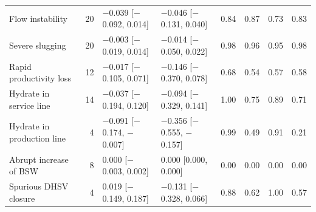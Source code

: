 \begin{tabular}{@{}>{\raggedright\arraybackslash}p{2.8cm} r l l rrrr@{}}
Flow instability & 20 & $-$0.039 [$-$0.092, 0.014] & $-$0.046 [$-$0.131, 0.040] & 0.84 & 0.87 & 0.73 & 0.83 \\
Severe slugging & 20 & $-$0.003 [$-$0.019, 0.014] & $-$0.014 [$-$0.050, 0.022] & 0.98 & 0.96 & 0.95 & 0.98 \\
Rapid productivity loss & 12 & $-$0.017 [$-$0.105, 0.071] & $-$0.146 [$-$0.370, 0.078] & 0.68 & 0.54 & 0.57 & 0.58 \\
Hydrate in service line & 14 & $-$0.037 [$-$0.194, 0.120] & $-$0.094 [$-$0.329, 0.141] & 1.00 & 0.75 & 0.89 & 0.71 \\
Hydrate in production line & 4 & $-$0.091 [$-$0.174, $-$0.007] & $-$0.356 [$-$0.555, $-$0.157] & 0.99 & 0.49 & 0.91 & 0.21 \\
Abrupt increase of BSW & 8 & 0.000 [$-$0.003, 0.002] & 0.000 [0.000, 0.000] & 0.00 & 0.00 & 0.00 & 0.00 \\
Spurious DHSV closure & 4 & 0.019 [$-$0.149, 0.187] & $-$0.131 [$-$0.328, 0.066] & 0.88 & 0.62 & 1.00 & 0.57 \\
\bottomrule
\end{tabular}
